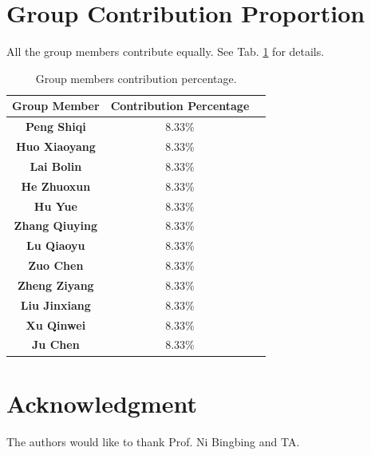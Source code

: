 \documentclass[journal]{IEEEtran}
\begin{document}
\appendices
\section{Group Contribution Proportion}

All the group members contribute equally. See Tab. \ref{tab_contri} for details.


\begin{table}[!htbp]
\centering
\caption{Group members contribution percentage.}
\label{tab_contri}
\begin{tabular}{ccc}
\toprule
\textbf{Group Member} & \textbf{Contribution Percentage} \\
\midrule
\textbf{Peng Shiqi} & 8.33\% \\
\textbf{Huo Xiaoyang} & 8.33\% \\
\textbf{Lai Bolin} & 8.33\% \\
\textbf{He Zhuoxun} & 8.33\% \\
\textbf{Hu Yue} & 8.33\% \\
\textbf{Zhang Qiuying} & 8.33\% \\
\textbf{Lu Qiaoyu} & 8.33\% \\
\textbf{Zuo Chen} & 8.33\% \\
\textbf{Zheng Ziyang} & 8.33\% \\
\textbf{Liu Jinxiang} & 8.33\% \\
\textbf{Xu Qinwei} & 8.33\% \\
\textbf{Ju Chen} & 8.33\% \\
\bottomrule
\end{tabular}
\end{table}



\section*{Acknowledgment}

The authors would like to thank Prof. Ni Bingbing and TA.


\ifCLASSOPTIONcaptionsoff
  \newpage
\fi
\end{document}
